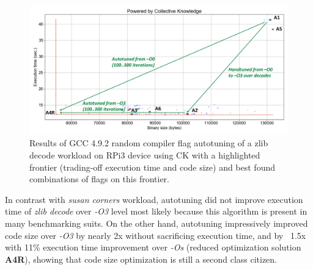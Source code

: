    \begin{figure}[!htbp]
     \centering
      \includegraphics[width=5.2in]
      {ck-assets/22f5af13e8e498aa-cropped.pdf} %
      \vspace{0.1in}
      \vspace{0.1in}
     \caption{
      Results of GCC 4.9.2 random compiler flag autotuning of a zlib decode workload on RPi3
      device using CK with a highlighted frontier (trading-off execution time and code size) 
      and best found combinations of flags on this frontier.
     }
     \label{fig:autotuning-zlib-decode-gcc4}
   \end{figure}

In contrast with \textit{susan corners} workload, autotuning did not improve execution time 
of \textit{zlib decode} over \textit{-O3} level most likely because this algorithm is present
in many benchmarking suits. 
%
On the other hand, autotuning impressively improved code size over \textit{-O3} 
by nearly 2x without sacrificing execution time, and by ~1.5x with 11\% execution time
improvement over \textit{-Os} (reduced optimization solution \textbf{A4R}), 
showing that code size optimization is still a second class citizen.

